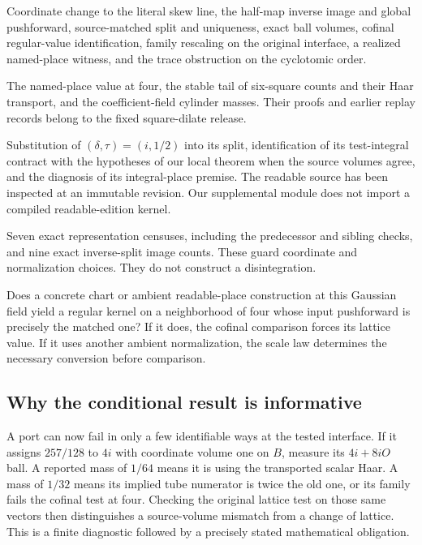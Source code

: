 \documentclass[12pt,letterpaper]{article}
\begin{document}
\begin{description}[leftmargin=1.3em,style=nextline]
\item[New kernel-checked mathematics.] Coordinate change to the literal skew line, the half-map inverse image and global pushforward, source-matched split and uniqueness, exact ball volumes, cofinal regular-value identification, family rescaling on the original interface, a realized named-place witness, and the trace obstruction on the cyclotomic order.
\item[Inherited kernel-checked inputs.] The named-place value at four, the stable tail of six-square counts and their Haar transport, and the coefficient-field cylinder masses. Their proofs and earlier replay records belong to the fixed square-dilate release.
\item[Written comparison with the readable edition.] Substitution of $(\delta,\tau)=(i,1/2)$ into its split, identification of its test-integral contract with the hypotheses of our local theorem when the source volumes agree, and the diagnosis of its integral-place premise. The readable source has been inspected at an immutable revision. Our supplemental module does not import a compiled readable-edition kernel.
\item[Independent computations.] Seven exact representation censuses, including the predecessor and sibling checks, and nine exact inverse-split image counts. These guard coordinate and normalization choices. They do not construct a disintegration.
\item[Remaining question.] Does a concrete chart or ambient readable-place construction at this Gaussian field yield a regular kernel on a neighborhood of four whose input pushforward is precisely the matched one? If it does, the cofinal comparison forces its lattice value. If it uses another ambient normalization, the scale law determines the necessary conversion before comparison.
\end{description}

\subsection{Why the conditional result is informative}
A port can now fail in only a few identifiable ways at the tested interface. If it assigns $257/128$ to $4i$ with coordinate volume one on $B$, measure its $4i+8iO$ ball. A reported mass of $1/64$ means it is using the transported scalar Haar. A mass of $1/32$ means its implied tube numerator is twice the old one, or its family fails the cofinal test at four. Checking the original lattice test on those same vectors then distinguishes a source-volume mismatch from a change of lattice. This is a finite diagnostic followed by a precisely stated mathematical obligation.
\end{document}
